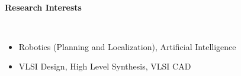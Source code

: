 \documentclass[a4paper,11pt]{article}
\newcommand{\isep}{-2 pt}
\newcommand{\lsep}{-0.5cm}
\newcommand{\resheading}[1]{{\small \colorbox{mygrey}{\begin{minipage}{0.975\textwidth}{\textbf{#1 \vphantom{p\^{E}}}}\end{minipage}}}}
\begin{document}
\hspace{0.5cm}\\
\hspace{0.5cm}\\
\hspace{0.5cm}\\
\hspace{0.5cm}\\
\hspace{0.5cm}\\
\hspace{0.5cm}\\
\hspace{0.5cm}\\
\hspace{0.5cm}\\
\hspace{0.5cm}\\
\hspace{0.5cm}\\
\hspace{0.5cm}\\[-0.2cm]

\begin{comment}
\begin{tabular}{m{8cm} m{8cm}} 
    \large{KRISHNA SAVANT SYREDDY}  & 100070056\\
    \large{Electrical Engineering}  & UG Third Year (B.Tech)\\
    \large{Indian Institute of Technology, Bombay} & DOB: 19-06-1993 \\
    \large{\url{sk.savant@iitb.ac.in}} & +919757033532
\end{tabular}

\resheading{\textbf{\large{Education}}}
\begin{itemize}
    \item Undergraduate Degree - IIT Bombay - 2008 to present  - 8.59
    \item Intermediate/+2 - BIE, AP - SR Junior College - 2010 - 90.50
    \item Matriculation - CBSE - Warangal Public School - 2008 - 93.00
\end{itemize}
\end{comment}


\resheading{\textbf{\large Research Interests}} \\[\lsep] 
\begin{itemize} \itemsep \isep
    \item Robotics (Planning and Localization), Artificial Intelligence 
    \item VLSI Design, High Level Synthesis, VLSI CAD
\end{itemize}
\end{document}
